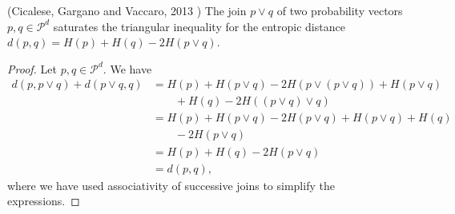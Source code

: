 \begin{lemma} (Cicalese, Gargano and Vaccaro, 2013 \cite{cicalese_information_2013}) \label{lem:comp_future} 
    The join $p \vee q$ of two probability vectors $p, q \in \mathcal{P}^d$ saturates the triangular inequality for the entropic distance $d(p, q) = H(p) + H(q) - 2H(p \vee q)$.
\end{lemma}

\begin{proof}
    Let $p, q \in \mathcal{P}^d$. We have
    \begin{align}
        d(p, p \vee q) + d(p \vee q, q) &= H(p) + H(p \vee q) - 2H(p \vee (p \vee q)) + H(p \vee q) \nonumber \\
        &\quad \quad + H(q) - 2H((p \vee q) \vee q) \\
        &= H(p) + H(p \vee q) - 2H(p \vee q) + H(p \vee q) + H(q) \nonumber\\
        &\quad \quad - 2H(p \vee q) \\
        &= H(p) + H(q) - 2H(p \vee q) \\
        &= d(p, q),
    \end{align}
    where we have used associativity of successive joins to simplify the expressions. \qedhere
\end{proof}

